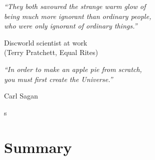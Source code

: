\documentclass[a4paper, 11pt, twoside]{Thesis}  %
\begin{document}

\cleardoublepage  %


\maketitleeng
\newpage{\pagestyle{empty}\cleardoublepage}

\pagestyle{empty}  %

\null\vfill
\begin{flushright}
\textit{``They both savoured the strange warm glow of \\
being much more ignorant than ordinary people, \\
who were only ignorant of ordinary things.''}\par
\smallskip
Discworld scientist at work \\
(Terry Pratchett, Equal Rites)
\end{flushright}
\bigskip
\begin{flushright}
\textit{``In order to make an apple pie from scratch, \\
you must first create the Universe.''}\par
\smallskip
Carl Sagan
\end{flushright}s

\vfill\vfill\vfill\vfill\vfill\vfill\null
\clearpage  %



\chapter*{Summary}
\end{document}
